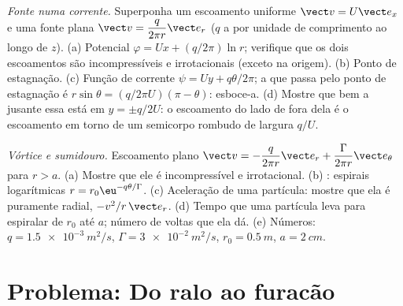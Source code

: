 \begin{exercise}[$\star\star\star$]\label{exo:b2:fluid-kinematics:11}
\emph{Fonte numa corrente.} Superponha um escoamento uniforme $\vect v = U\vect e_x$
e uma fonte plana $\vect v = \dfrac{q}{2\pi r}\vect e_r$ ($q$ a  por unidade de comprimento ao longo de $z$). (a) Potencial $\varphi = Ux +
(q/2\pi)\ln r$; verifique que os dois escoamentos são incompressíveis e irrotacionais
(exceto na origem). (b) Ponto de estagnação. (c) Função de corrente $\psi
= Uy + q\theta/2\pi$; a  que passa pelo ponto de estagnação é
$r\sin\theta = (q/2\pi U)(\pi - \theta)$: esboce-a. (d) Mostre que bem
a jusante essa  está em $y = \pm q/2U$: o escoamento do lado de fora dela é
o escoamento em torno de um semicorpo rombudo de largura $q/U$.
\end{exercise}

\begin{exercise}[$\star\star\star$]\label{exo:b2:fluid-kinematics:12}
\emph{Vórtice e sumidouro.} Escoamento plano $\vect v = -\dfrac{q}{2\pi r}\vect e_r +
\dfrac{\Gamma}{2\pi r}\vect e_\theta$ para $r > a$. (a) Mostre que ele é
incompressível e irrotacional. (b) : espirais logarítmicas
$r = r_0\eu^{-q\theta/\Gamma}$. (c) Aceleração de uma partícula: mostre que ela é
puramente radial, $-v^2/r\,\vect e_r$. (d) Tempo que uma partícula leva para espiralar
de $r_0$ até $a$; número de voltas que ela dá. (e) Números: $q =
\qty{1.5e-3}{m^2/s}$, $\Gamma = \qty{3e-2}{m^2/s}$, $r_0 = \qty{0.5}{m}$,
$a = \qty{2}{cm}$.
\end{exercise}

\section{Problema: Do ralo ao furacão}

